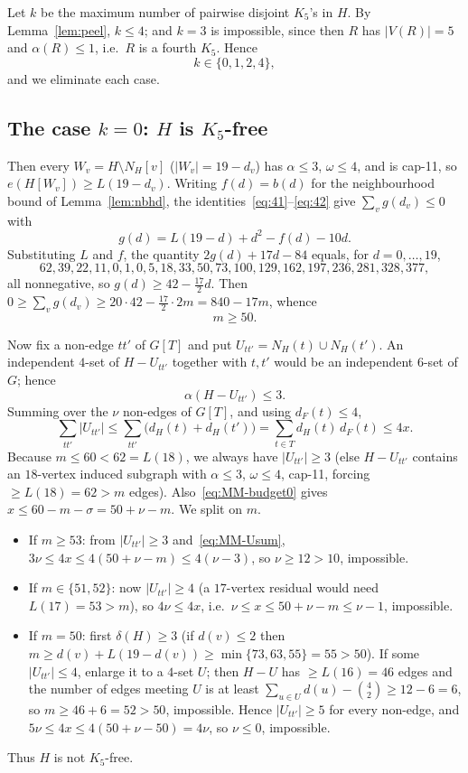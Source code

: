 \documentclass[11pt,reqno]{amsart}
\theoremstyle{definition}
\theoremstyle{remark}
\newcommand{\abs}[1]{\left|#1\right|}
\newcommand{\capeleven}{\textsf{cap-11}}
\begin{document}
Let $k$ be the maximum number of pairwise disjoint $K_5$'s in $H$. By
Lemma~\ref{lem:peel}, $k\le 4$; and $k=3$ is impossible, since then $R$ has
$\abs{V(R)}=5$ and $\alpha(R)\le 1$, i.e.\ $R$ is a fourth $K_5$. Hence
\[
  k\in\{0,1,2,4\},
\]
and we eliminate each case.

\subsection{The case $k=0$: $H$ is $K_5$-free}\label{ssec:MM-free}
Then every $W_v=H\setminus N_H[v]$ ($\abs{W_v}=19-d_v$) has $\alpha\le 3$,
$\omega\le 4$, and is \capeleven, so $e(H[W_v])\ge L(19-d_v)$. Writing $f(d)=b(d)$
for the neighbourhood bound of Lemma~\ref{lem:nbhd}, the
identities~\eqref{eq:41}--\eqref{eq:42} give $\sum_v g(d_v)\le 0$ with
\[
  g(d)=L(19-d)+d^2-f(d)-10d .
\]
Substituting $L$ and $f$, the quantity $2g(d)+17d-84$ equals, for $d=0,\dots,19$,
\[
  62,39,22,11,0,1,0,5,18,33,50,73,100,129,162,197,236,281,328,377,
\]
all nonnegative, so $g(d)\ge 42-\tfrac{17}2 d$. Then
$0\ge\sum_v g(d_v)\ge 20\cdot 42-\tfrac{17}2\cdot 2m=840-17m$, whence
\begin{equation}\label{eq:MM-m50}
  m\ge 50 .
\end{equation}

Now fix a non-edge $tt'$ of $G[T]$ and put $U_{tt'}=N_H(t)\cup N_H(t')$. An
independent $4$-set of $H-U_{tt'}$ together with $t,t'$ would be an independent
$6$-set of $G$; hence
\begin{equation}\label{eq:MM-Ualpha}
  \alpha(H-U_{tt'})\le 3 .
\end{equation}
Summing over the $\nu$ non-edges of $G[T]$, and using $d_F(t)\le 4$,
\begin{equation}\label{eq:MM-Usum}
  \sum_{tt'}\abs{U_{tt'}}\le\sum_{tt'}\bigl(d_H(t)+d_H(t')\bigr)
  =\sum_{t\in T}d_H(t)\,d_F(t)\le 4x .
\end{equation}
Because $m\le 60<62=L(18)$, we always have $\abs{U_{tt'}}\ge 3$ (else $H-U_{tt'}$
contains an $18$-vertex induced subgraph with $\alpha\le 3$, $\omega\le 4$,
\capeleven, forcing $\ge L(18)=62>m$ edges). Also~\eqref{eq:MM-budget0} gives
$x\le 60-m-\sigma=50+\nu-m$. We split on $m$.
\begin{itemize}[nosep]
\item If $m\ge 53$: from $\abs{U_{tt'}}\ge 3$ and~\eqref{eq:MM-Usum},
$3\nu\le 4x\le 4(50+\nu-m)\le 4(\nu-3)$, so $\nu\ge 12>10$, impossible.
\item If $m\in\{51,52\}$: now $\abs{U_{tt'}}\ge 4$ (a $17$-vertex residual would need
$L(17)=53>m$), so $4\nu\le 4x$, i.e.\ $\nu\le x\le 50+\nu-m\le\nu-1$, impossible.
\item If $m=50$: first $\delta(H)\ge 3$ (if $d(v)\le 2$ then
$m\ge d(v)+L(19-d(v))\ge\min\{73,63,55\}=55>50$). If some $\abs{U_{tt'}}\le 4$,
enlarge it to a $4$-set $U$; then $H-U$ has $\ge L(16)=46$ edges and the number of
edges meeting $U$ is at least $\sum_{u\in U}d(u)-\binom 42\ge 12-6=6$, so
$m\ge 46+6=52>50$, impossible. Hence $\abs{U_{tt'}}\ge 5$ for every non-edge, and
$5\nu\le 4x\le 4(50+\nu-50)=4\nu$, so $\nu\le 0$, impossible.
\end{itemize}
Thus $H$ is not $K_5$-free.
\end{document}
